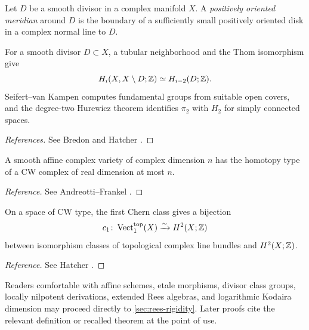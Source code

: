 \begin{definition}[Meridian]\label{def:meridian}
Let $D$ be a smooth divisor in a complex manifold $X$.  A \emph{positively oriented meridian} around $D$ is the boundary of a sufficiently small positively oriented disk in a complex normal line to $D$.
\end{definition}

\begin{recalledtheorem}\label{thm:topological-tools}
For a smooth divisor $D\subset X$, a tubular neighborhood and the Thom isomorphism give
\[
  H_i(X,X\setminus D;\mathbb Z)\simeq H_{i-2}(D;\mathbb Z).
\]
Seifert--van Kampen computes fundamental groups from suitable open covers, and the degree-two Hurewicz theorem identifies $\pi_2$ with $H_2$ for simply connected spaces.
\end{recalledtheorem}

\begin{proof}[References]
See Bredon \cite[Chapters VI and VII]{Bredon1993} and Hatcher \cite[Sections 1.2 and 4.2]{Hatcher2002}.
\end{proof}

\begin{recalledtheorem}\label{thm:andreotti-frankel}
A smooth affine complex variety of complex dimension $n$ has the homotopy type of a CW complex of real dimension at most $n$.
\end{recalledtheorem}

\begin{proof}[Reference]
See Andreotti--Frankel \cite{AndreottiFrankel1959}.
\end{proof}

\begin{recalledtheorem}\label{thm:topological-line-bundles}
On a space of CW type, the first Chern class gives a bijection
\[
  c_1\colon\operatorname{Vect}^{\mathrm{top}}_1(X)
  \xrightarrow{\sim} H^2(X;\mathbb Z)
\]
between isomorphism classes of topological complex line bundles and $H^2(X;\mathbb Z)$.
\end{recalledtheorem}

\begin{proof}[Reference]
See Hatcher \cite[Proposition 3.10]{HatcherVBKT}.
\end{proof}

\begin{roadmap}\label{roadmap:preliminaries}
Readers comfortable with affine schemes, etale morphisms, divisor class groups, locally nilpotent derivations, extended Rees algebras, and logarithmic Kodaira dimension may proceed directly to \cref{sec:rees-rigidity}.  Later proofs cite the relevant definition or recalled theorem at the point of use.
\end{roadmap}

